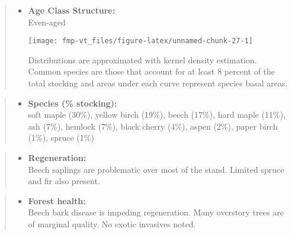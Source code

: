 \documentclass[]{tufte-handout}
\providecommand{\tightlist}{%
  \setlength{\itemsep}{0pt}\setlength{\parskip}{0pt}}
\begin{document}
\begin{quote}
\begin{itemize}
\tightlist
\item
  \textbf{Age Class Structure:}\\
  \vspace{2pt} Even-aged\\

  \begin{marginfigure}
  \texttt{[image: fmp-vt\_files/figure-latex/unnamed-chunk-27-1]} \caption[Distributions are approximated with kernel density estimation]{Distributions are approximated with kernel density estimation. Common species are those that account for at least 8 percent of the total stocking and areas under each curve represent species basal areas.}\label{fig:unnamed-chunk-27}
  \end{marginfigure}
\end{itemize}
\end{quote}

\begin{quote}
\begin{itemize}
\tightlist
\item
  \textbf{Species (\% stocking):}\\
  \vspace{2pt} soft maple (30\%), yellow birch (19\%), beech (17\%),
  hard maple (11\%), ash (7\%), hemlock (7\%), black cherry (4\%), aspen
  (2\%), paper birch (1\%), spruce (1\%)
\end{itemize}
\end{quote}

\begin{quote}
\begin{itemize}
\tightlist
\item
  \textbf{Regeneration:}\\
  \vspace{2pt} Beech saplings are problematic over most of the stand.
  Limited spruce and fir also present.
\end{itemize}
\end{quote}

\begin{quote}
\begin{itemize}
\tightlist
\item
  \textbf{Forest health:}\\
  \vspace{2pt} Beech bark disease is impeding regeneration. Many
  overstory trees are of marginal quality. No exotic invasives noted.
\end{itemize}
\end{quote}
\end{document}

